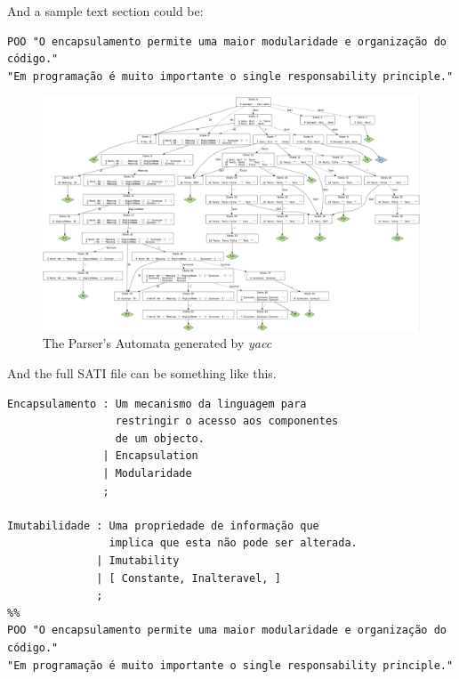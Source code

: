 \documentclass[a4paper]{report}
\begin{document}
And a sample text section could be:

\begin{verbatim}
POO "O encapsulamento permite uma maior modularidade e organização do código."
"Em programação é muito importante o single responsability principle."
\end{verbatim}

\begin{landscape}
    \begin{figure}[p]
        \includegraphics[height=\textwidth]{./sati.jpg}
        \caption{The Parser's Automata generated by \textit{yacc}}
    \end{figure}
\end{landscape}

And the full SATI file can be something like this.

\begin{verbatim}
Encapsulamento : Um mecanismo da linguagem para
                 restringir o acesso aos componentes
                 de um objecto.
               | Encapsulation
               | Modularidade
               ;

Imutabilidade : Uma propriedade de informação que
                implica que esta não pode ser alterada.
              | Imutability
              | [ Constante, Inalteravel, ]
              ;
%%
POO "O encapsulamento permite uma maior modularidade e organização do código."
"Em programação é muito importante o single responsability principle."
\end{verbatim}
\end{document}
